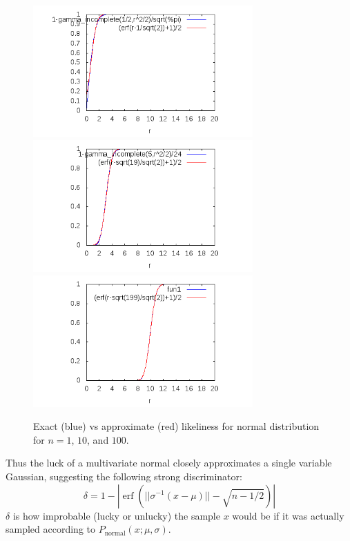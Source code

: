 \documentclass{article}
\DeclareMathOperator{\erf}{erf}
\begin{document}
\begin{figure}
  \caption{Exact (blue) vs approximate (red) likeliness for normal distribution for $n=1$, $10$, and $100$.}
  \centering
    \includegraphics[width=0.75\textwidth]{img/luck1}
    \includegraphics[width=0.75\textwidth]{img/luck10}
    \includegraphics[width=0.75\textwidth]{img/luck100}
\end{figure}

Thus the luck of a multivariate normal closely approximates a single variable Gaussian, suggesting the following strong discriminator: 
\begin{equation}
\delta=1-|\erf(||\sigma^{-1}(x-\mu)||-\sqrt{n-1/2})|
\end{equation}
$\delta$ is how improbable (lucky or unlucky) the sample $x$ would be if it was actually sampled according to $P_{\text{normal}}(x;\mu,\sigma)$.
\end{document}
